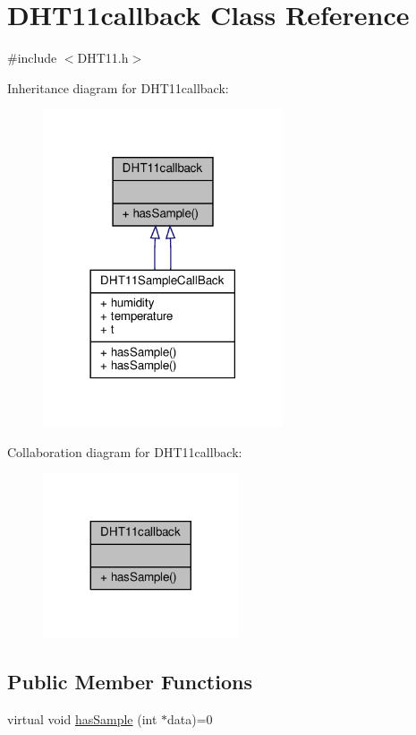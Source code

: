 \hypertarget{classDHT11callback}{}\section{D\+H\+T11callback Class Reference}
\label{classDHT11callback}


{\ttfamily \#include $<$D\+H\+T11.\+h$>$}



Inheritance diagram for D\+H\+T11callback\+:
\nopagebreak
\begin{figure}[H]
\begin{center}
\leavevmode
\includegraphics[width=201pt]{classDHT11callback__inherit__graph}
\end{center}
\end{figure}


Collaboration diagram for D\+H\+T11callback\+:
\nopagebreak
\begin{figure}[H]
\begin{center}
\leavevmode
\includegraphics[width=164pt]{classDHT11callback__coll__graph}
\end{center}
\end{figure}
\subsection*{Public Member Functions}
\begin{DoxyCompactItemize}
\item 
virtual void \hyperlink{classDHT11callback_a57f4987fa9018acd572166a6c62b57d6}{has\+Sample} (int $\ast$data)=0
\end{DoxyCompactItemize}


